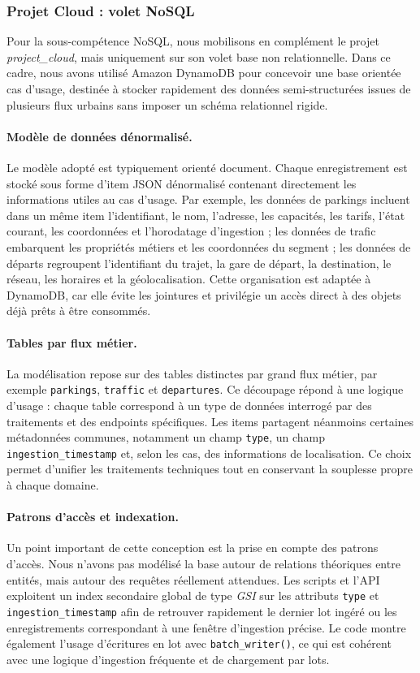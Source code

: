 \documentclass{article}
\begin{document}
\newpage
\subsubsection{Projet Cloud : volet NoSQL}

Pour la sous-compétence NoSQL, nous mobilisons en complément le projet
\textit{project\_cloud}, mais uniquement sur son volet base non relationnelle.
Dans ce cadre, nous avons utilisé Amazon DynamoDB pour concevoir une base orientée
cas d'usage, destinée à stocker rapidement des données semi-structurées issues de
plusieurs flux urbains sans imposer un schéma relationnel rigide.

\paragraph{Modèle de données dénormalisé.}
Le modèle adopté est typiquement orienté document. Chaque enregistrement est
stocké sous forme d'item JSON dénormalisé contenant directement les informations
utiles au cas d'usage. Par exemple, les données de parkings incluent dans un même
item l'identifiant, le nom, l'adresse, les capacités, les tarifs, l'état courant,
les coordonnées et l'horodatage d'ingestion ; les données de trafic embarquent les
propriétés métiers et les coordonnées du segment ; les données de départs
regroupent l'identifiant du trajet, la gare de départ, la destination, le réseau,
les horaires et la géolocalisation. Cette organisation est adaptée à DynamoDB,
car elle évite les jointures et privilégie un accès direct à des objets déjà prêts
à être consommés.

\paragraph{Tables par flux métier.}
La modélisation repose sur des tables distinctes par grand flux métier, par
exemple \texttt{parkings}, \texttt{traffic} et \texttt{departures}. Ce découpage
répond à une logique d'usage : chaque table correspond à un type de données
interrogé par des traitements et des endpoints spécifiques. Les items partagent
néanmoins certaines métadonnées communes, notamment un champ \texttt{type}, un
champ \texttt{ingestion\_timestamp} et, selon les cas, des informations de
localisation. Ce choix permet d'unifier les traitements techniques tout en
conservant la souplesse propre à chaque domaine.

\paragraph{Patrons d'accès et indexation.}
Un point important de cette conception est la prise en compte des patrons d'accès.
Nous n'avons pas modélisé la base autour de relations théoriques entre entités,
mais autour des requêtes réellement attendues. Les scripts et l'API exploitent un
index secondaire global de type \textit{GSI} sur les attributs \texttt{type} et
\texttt{ingestion\_timestamp} afin de retrouver rapidement le dernier lot ingéré
ou les enregistrements correspondant à une fenêtre d'ingestion précise. Le code
montre également l'usage d'écritures en lot avec \texttt{batch\_writer()}, ce qui
est cohérent avec une logique d'ingestion fréquente et de chargement par lots.
\end{document}
